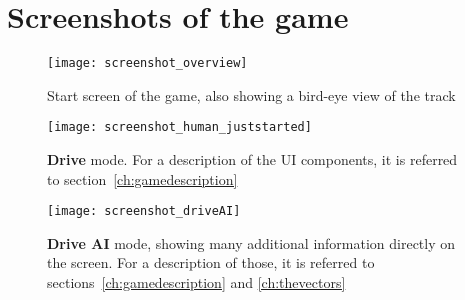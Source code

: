 


\chapter{Screenshots of the game} %

\begin{figure}[h]
	\texttt{[image: screenshot\_overview]}
	\centering
	\caption{Start screen of the game, also showing a bird-eye view of the track}
	\label{fig:overviewshot}
\end{figure}

\begin{figure}[h]
	\texttt{[image: screenshot\_human\_juststarted]}
	\centering
	\caption{\textbf{Drive} mode. For a description of the UI components, it is referred to section~\ref{ch:gamedescription}}
	\label{fig:humandriveshot}
\end{figure}

\begin{figure}[h]
	\texttt{[image: screenshot\_driveAI]}
	\centering
	\caption{\textbf{Drive AI} mode, showing many additional information directly on the screen. For a description of those, it is referred to sections~\ref{ch:gamedescription} and \ref{ch:thevectors}}
	\label{fig:aidriveshot}
\end{figure}
